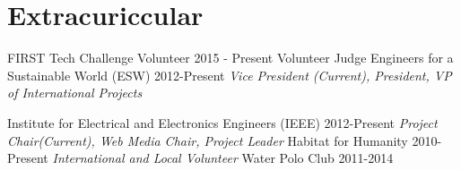 \documentclass[]{friggeri-cv} %
\begin{document}
\vspace{-10pt}
\section{Extracuriccular}

\begin{entrylist}
\entryFourItem
{FIRST Tech Challenge Volunteer}
{2015 - Present}
{}
{Volunteer Judge}
\entryFourItem
{Engineers for a Sustainable World (ESW)}
{2012-Present}
{}
{\emph{Vice President (Current), President, VP of International Projects}}

\entryFourItem
{Institute for Electrical and Electronics Engineers  (IEEE)}
{2012-Present}
{}
{\emph{Project Chair(Current), Web Media Chair, Project Leader}}
\entryFourItem
{Habitat for Humanity}
{2010-Present}
{}
{\emph{International and Local Volunteer}}
\entryFourItem
{Water Polo Club}
{2011-2014}
{}
{\emph{}}

\end{entrylist}
\vspace{-8pt}
\vspace{-8pt}
\end{document}
